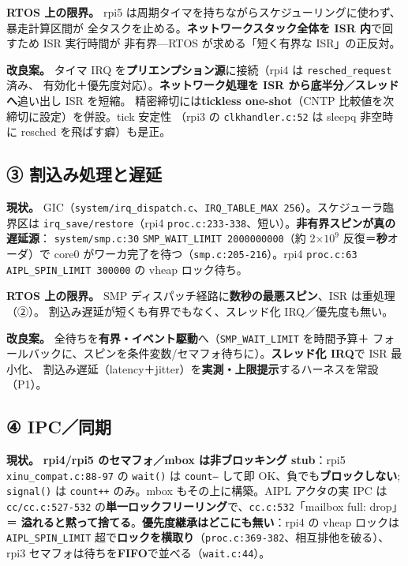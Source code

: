 \documentclass[11pt,a4paper]{article}
\newcommand{\code}[1]{\texttt{\small #1}}
\newcommand{\limt}[1]{\textbf{\textcolor{red!55!black}{#1}}}
\newcommand{\fix}[1]{\textbf{\textcolor{green!35!black}{#1}}}
\begin{document}
\limt{RTOS 上の限界。} rpi5 は周期タイマを持ちながらスケジューリングに使わず、暴走計算区間が
全タスクを止める。\textbf{ネットワークスタック全体を ISR 内}で回すため ISR 実行時間が
非有界—RTOS が求める「短く有界な ISR」の正反対。

\fix{改良案。} タイマ IRQ を\textbf{プリエンプション源}に接続（rpi4 は \code{resched\_request} 済み、
有効化＋優先度対応）。\textbf{ネットワーク処理を ISR から底半分／スレッドへ}追い出し ISR を短縮。
精密締切には\textbf{tickless one-shot}（CNTP 比較値を次締切に設定）を併設。tick 安定性
（rpi3 の \code{clkhandler.c:52} は sleepq 非空時に resched を飛ばす癖）も是正。

\subsection{③ 割込み処理と遅延}
\textbf{現状。} GIC（\code{system/irq\_dispatch.c}、\code{IRQ\_TABLE\_MAX 256}）。スケジューラ臨界区は
\code{irq\_save/restore}（rpi4 \code{proc.c:233-338}、短い）。\limt{非有界スピンが真の遅延源}：
\code{system/smp.c:30} \code{SMP\_WAIT\_LIMIT 2000000000}（約 2$\times10^9$ 反復＝\textbf{秒}オーダ）で
core0 がワーカ完了を待つ（\code{smp.c:205-216}）。rpi4 \code{proc.c:63} \code{AIPL\_SPIN\_LIMIT 300000}
の vheap ロック待ち。

\limt{RTOS 上の限界。} SMP ディスパッチ経路に\textbf{数秒の最悪スピン}、ISR は重処理（②）。
割込み遅延が短くも有界でもなく、スレッド化 IRQ／優先度も無い。

\fix{改良案。} 全待ちを\textbf{有界・イベント駆動}へ（\code{SMP\_WAIT\_LIMIT} を時間予算＋
フォールバックに、スピンを条件変数/セマフォ待ちに）。\textbf{スレッド化 IRQ}で ISR 最小化、
割込み遅延（latency＋jitter）を\textbf{実測・上限提示}するハーネスを常設（P1）。

\subsection{④ IPC／同期}
\textbf{現状。} \limt{rpi4/rpi5 のセマフォ／mbox は非ブロッキング stub}：rpi5
\code{xinu\_compat.c:88-97} の \code{wait()} は \code{count--} して即 OK、負でも\textbf{ブロックしない};
\code{signal()} は \code{count++} のみ。mbox もその上に構築。AIPL アクタの実 IPC は
\code{cc/cc.c:527-532} の\textbf{単一ロックフリーリング}で、\code{cc.c:532}「mailbox full: drop」＝
\textbf{溢れると黙って捨てる}。\limt{優先度継承はどこにも無い}：rpi4 の vheap ロックは
\code{AIPL\_SPIN\_LIMIT} 超で\textbf{ロックを横取り}（\code{proc.c:369-382}、相互排他を破る）、
rpi3 セマフォは待ちを\textbf{FIFO}で並べる（\code{wait.c:44}）。
\end{document}
